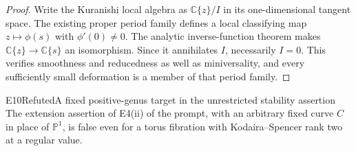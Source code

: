 \begin{proof}
Write the Kuranishi local algebra as $\mathbb C\{z\}/I$ in its
one-dimensional tangent space. The existing proper period family
defines a local classifying map $z\mapsto\phi(s)$ with
$\phi'(0)\ne0$. The analytic inverse-function theorem makes
$\mathbb C\{z\}\to\mathbb C\{s\}$ an isomorphism. Since it
annihilates $I$, necessarily $I=0$. This verifies smoothness and
reducedness as well as miniversality, and every sufficiently small
deformation is a member of that period family.
\end{proof}

\begin{statement}{E10}{Refuted}{A fixed positive-genus target in the unrestricted stability assertion}
The extension assertion of E4(ii) of the prompt, with an arbitrary
fixed curve $C$ in place of $\mathbb P^1$, is false even for a torus
fibration with Kodaira--Spencer rank two at a regular value.
\end{statement}
